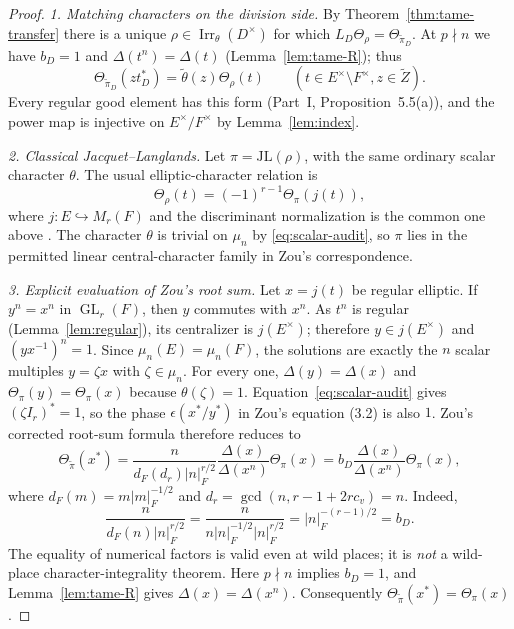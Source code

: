 \documentclass[11pt]{article}
\newcommand{\GL}{\operatorname{GL}}
\newcommand{\Irr}{\operatorname{Irr}}
\newcommand{\tZ}{\widetilde Z}
\newcommand{\JL}{\mathrm{JL}}
\theoremstyle{plain}
\theoremstyle{definition}
\begin{document}
\begin{proof}
\emph{1. Matching characters on the division side.}
By Theorem~\ref{thm:tame-transfer} there is a unique
$\rho\in\Irr_\theta(D^\times)$ for which
$L_D\Theta_\rho=\Theta_{\widetilde\pi_D}$.
At $p\nmid n$ we have $b_D=1$ and
$\Delta(t^n)=\Delta(t)$ (Lemma~\ref{lem:tame-R}); thus
\begin{equation}\label{eq:div-D2-step}
 \Theta_{\widetilde\pi_D}(z t_D^*)
   =\widetilde\theta(z)\Theta_\rho(t)
 \qquad(t\in E^\times\setminus F^\times,
            z\in\tZ).
\end{equation}
Every regular good element has this form (Part~I,
Proposition~5.5(a)), and the power map is injective on
$E^\times/F^\times$ by Lemma~\ref{lem:index}.

\emph{2. Classical Jacquet--Langlands.}
Let $\pi=\JL(\rho)$, with the same ordinary scalar character
$\theta$.  The usual elliptic-character relation is
\begin{equation}\label{eq:linear-D2-step}
 \Theta_\rho(t)=(-1)^{r-1}\Theta_\pi(j(t)),
\end{equation}
where $j:E\hookrightarrow M_r(F)$ and the discriminant
normalization is the common one above \cite{DKV}.
The character $\theta$ is trivial on $\mu_n$ by
\eqref{eq:scalar-audit}, so $\pi$ lies in the permitted
linear central-character family in Zou's correspondence.

\emph{3. Explicit evaluation of Zou's root sum.}
Let $x=j(t)$ be regular elliptic.  If $y^n=x^n$ in
$\GL_r(F)$, then $y$ commutes with $x^n$.  As $t^n$
is regular (Lemma~\ref{lem:regular}), its centralizer is
$j(E^\times)$; therefore $y\in j(E^\times)$ and
$(yx^{-1})^n=1$.  Since $\mu_n(E)=\mu_n(F)$, the
solutions are exactly the $n$ scalar multiples
$y=\zeta x$ with $\zeta\in\mu_n$.
For every one, $\Delta(y)=\Delta(x)$ and
$\Theta_\pi(y)=\Theta_\pi(x)$ because
$\theta(\zeta)=1$.  Equation~\eqref{eq:scalar-audit}
gives $(\zeta I_r)^*=1$, so the phase
$\epsilon(x^*/y^*)$ in Zou's equation (3.2) is also $1$.
Zou's corrected root-sum formula therefore reduces to
\begin{equation}\label{eq:zou-D2-step}
 \Theta_{\widetilde\pi}(x^*)
  =\frac{n}{d_F(d_r)|n|_F^{r/2}}
   \frac{\Delta(x)}{\Delta(x^n)}\Theta_\pi(x)
  =b_D\frac{\Delta(x)}{\Delta(x^n)}\Theta_\pi(x),
\end{equation}
where $d_F(m)=m|m|_F^{-1/2}$ and
$d_r=\gcd(n,r-1+2rc_v)=n$.  Indeed,
\[
 \frac{n}{d_F(n)|n|_F^{r/2}}
 =\frac{n}{n|n|_F^{-1/2}|n|_F^{r/2}}
 =|n|_F^{-(r-1)/2}=b_D.
\]
The equality of numerical factors is valid even at wild places;
it is \emph{not} a wild-place character-integrality theorem.
Here $p\nmid n$ implies $b_D=1$, and
Lemma~\ref{lem:tame-R} gives $\Delta(x)=\Delta(x^n)$.
Consequently $\Theta_{\widetilde\pi}(x^*)
=\Theta_\pi(x)$.


\end{proof}
\end{document}
